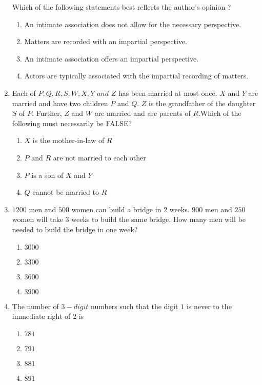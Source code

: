 \documentclass[journal]{IEEEtran}
\begin{document}
\begin{enumerate}
    Which of the following statements best reflects the author's opinion ?
    \begin{enumerate}
        \item An intimate association does not allow for the necessary perspective.
        \item Matters are recorded with an impartial perspective.
        \item An intimate association offers an impartial perspective.
        \item Actors are typically associated with the impartial recording of matters.
    \end{enumerate}
    \item Each of $P,Q,R,S,W,X,Y\,\,and\,\,Z$ has been married at most once. $X$ and $Y$ are married and have two children $P$ and $Q$. $Z$ is the grandfather of the daughter $S$ of $P$. Further,  $Z$ and $W$ are married and are parents of $R$.Which of the following must necessarily be FALSE?
    \begin{enumerate}
        \item $X$ is the mother-in-law of $R$
        \item $P$ and $R$ are not married to each other
        \item $P$ is a son of $X$ and $Y$
        \item $Q$ cannot be married to $R$
    \end{enumerate}
    \item $1200$ men and $500$ women can build a bridge in $2$ weeks. $900$ men and $250$ women will take $3$ weeks to build the same bridge. How many men will be needed to build the bridge in one week?
    \begin{enumerate}
        \item $3000$
        \item $3300$
        \item $3600$
        \item $3900$
    \end{enumerate}
    \item The number of $3-digit$ numbers such that the digit $1$ is never to the immediate right of $2$ is 
    \begin{enumerate}
        \item $781$
        \item $791$
        \item $881$
        \item $891$
    \end{enumerate}
\end{enumerate}
\end{document}
